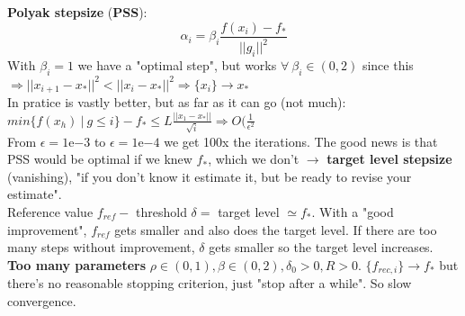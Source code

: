 \documentclass[10pt]{report}
\begin{document}
\textbf{Polyak stepsize} (\textbf{PSS}): $$\alpha_i = \beta_i\frac{f(x_i)-f_*}{||g_i||^2}$$ With $\beta_i = 1$ we have a "optimal step", but works $\forall\:\beta_i\in(0,2)$ since this $\Rightarrow ||x_{i+1}-x_*||^2 < ||x_i-x_*||^2\Rightarrow \{x_i\}\rightarrow x_*$\\
In pratice is vastly better, but as far as it can go (not much): $min\{f(x_h)\:|\:g\leq i\}-f_*\leq L\frac{||x_1-x_*||}{\sqrt{i}}\Rightarrow O(\frac{1}{\epsilon^2}$\\
From $\epsilon=1$e$-3$ to $\epsilon=1$e$-4$ we get 100x the iterations. The good news is that PSS would be optimal if we knew $f_*$, which we don't $\rightarrow$ \textbf{target level stepsize} (vanishing), "if you don't know it estimate it, but be ready to revise your estimate".\\
Reference value $f_{ref} -$ threshold $\delta =$ target level $\simeq f_*$. With a "good improvement", $f_{ref}$ gets smaller and also does the target level. If there are too many steps without improvement, $\delta$ gets smaller so the target level increases.\\
\textbf{Too many parameters} $\rho\in(0,1),\beta\in(0,2),\delta_0>0,R>0$. $\{f_{rec,i}\}\rightarrow f_*$ but there's no reasonable stopping criterion, just "stop after a while". So slow convergence.
\end{document}
